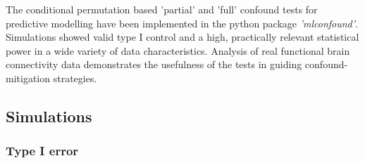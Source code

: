 \documentclass{article}
\begin{document}
The conditional permutation based 'partial' and 'full' confound tests for predictive modelling have been implemented in the python package \emph{'mlconfound'}. Simulations showed valid type I control and a high, practically relevant statistical power in a wide variety of data characteristics. Analysis of real functional brain connectivity data demonstrates the usefulness of the tests in guiding confound-mitigation strategies.

\subsection{Simulations}

\subsubsection*{Type I error}
\end{document}
